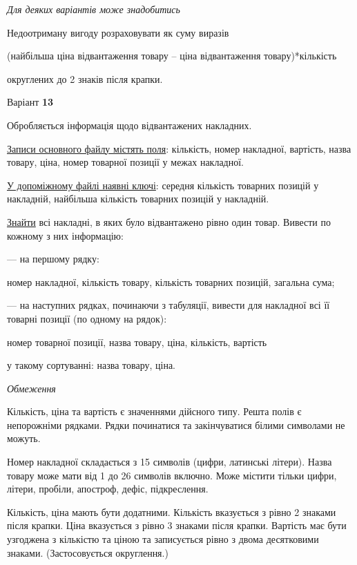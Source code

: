 \documentclass[11pt, ukrainian]{article}
\begin{document}
\bigskip\textit{Для деяких варіантів може знадобитись}

Недоотриману вигоду розраховувати як суму виразів
{\center (найбільша ціна відвантаження товару – ціна відвантаження товару)*кількість\par}

\bigskip
{\noindent} округлених до 2 знаків після крапки.


\par
\newpage
{\center Варіант  \No \textbf { 13 }\par}
\bigskip
Обробляється інформація щодо відвантажених накладних.

\underline{Записи основного файлу містять поля}: кількість, номер накладної, вартість, назва товару, ціна, номер товарної позиції у межах накладної.

\underline{У допоміжному файлі наявні ключі}: середня кількість товарних позицій у накладній, найбільша кількість товарних позицій у накладній.

\underline{Знайти} всі накладні, в яких було відвантажено рівно один товар. Вивести по кожному з них інформацію:\par
{\noindent}--- на першому рядку:\par
номер накладної, кількість товару, кількість товарних позицій, загальна сума;

{\noindent}--- на наступних рядках, починаючи з табуляції, вивести для накладної всі її товарні позиції (по одному на рядок):\par
номер товарної позиції, назва товару, ціна, кількість, вартість

{\noindent}у такому сортуванні: назва товару, ціна.


\bigskip\textit{Обмеження}

Кількість, ціна та вартість є значеннями дійсного типу.
Решта полів є непорожніми рядками.
Рядки починатися та закінчуватися білими символами не можуть.

Номер накладної складається з 15 символів (цифри, латинські літери).
Назва товару може мати від 1 до 26 символів включно.
Може містити тільки цифри, літери, пробіли, апостроф, дефіс, підкреслення.

Кількість, ціна мають бути додатними.
Кількість вказується з рівно 2 знаками після крапки.
Ціна вказується з рівно 3 знаками після крапки.
Вартість має бути узгоджена з кількістю та ціною та записується рівно з двома десятковими знаками.
(Застосовується округлення.)
\end{document}
